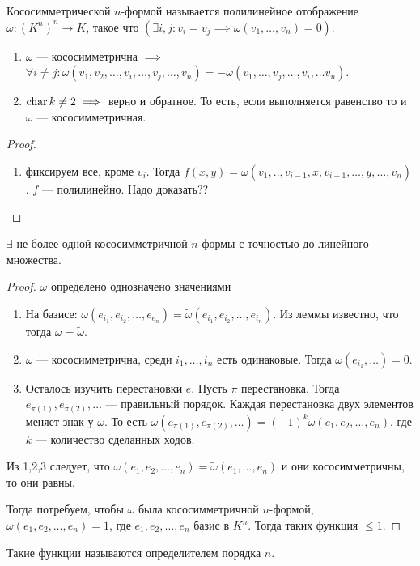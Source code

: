 \begin{definition}
    Кососимметрической $n$-формой называется полилинейное отображение  $\omega\!: (K^n)^n \to K$, такое что  $(\exists i, j\!: v_i = v_j \implies \omega(v_1, \ldots, v_n) = 0)$.
\end{definition}
\begin{statement}
    \begin{enumerate}
        \item $\omega$ --- кососимметрична  $\implies$  $\forall i \neq j\!: \omega(v_1, v_2, \ldots, v_i, \ldots, v_j, \ldots, v_n) = - \omega(v_1,\ldots, v_j, \ldots, v_i, \ldots v_n)$.
        \item $\operatorname{char} k \neq 2 \implies $ верно и обратное. То есть, если выполняется равенство то и  $\omega$ --- кососимметричная. 
    \end{enumerate}
\end{statement}
\begin{proof}
    \begin{enumerate}
        \item фиксируем все, кроме $v_i$. Тогда  $f(x, y) = \omega(v_1, .., v_{i-1}, x, v_{i+1}, \ldots, y, \ldots, v_n)$. $f$ --- полилинейно. Надо доказать?? 
    \end{enumerate}
\end{proof}
\begin{statement}
    $\exists$ не более одной кососимметричной  $n$-формы с точностью до линейного множества. 
\end{statement}
\begin{proof}
    $\omega$ определено однозначено значениями
     \begin{enumerate}
         \item На базисе: $\omega(e_{i_1}, e_{i_2}, \ldots, e_{e_n}) = \widetilde{\omega}(e_{i_1}, e_{i_2}, \ldots, e_{i_n})$. Из леммы известно, что тогда $\omega = \widetilde{\omega}$. 
         \item $\omega$ --- кососимметрична, среди  $i_1, \ldots, i_n$ есть одинаковые. Тогда $\omega(e_{i_1},\ldots) = 0$.
         \item Осталось изучить перестановки $e$. Пусть $\pi$ перестановка. Тогда  $e_{\pi(1)}, e_{\pi(2)}, \ldots$ --- правильный порядок. Каждая перестановка двух элементов меняет знак у $\omega$. То есть  $\omega(e_{\pi(1)}, e_{\pi(2)}, \ldots) = (-1)^k \omega(e_1, e_2, \ldots, e_n)$, где $k$ --- количество сделанных ходов.
    \end{enumerate}
    Из 1,2,3 следует, что  $\omega(e_1, e_2, \ldots, e_n) = \widetilde{\omega}(e_1, \ldots, e_n)$ и они кососимметричны, то они равны. 

    Тогда потребуем, чтобы $\omega$ была кососимметричной  $n$-формой,  $\omega(e_1, e_2,\ldots, e_n) = 1$, где $e_1, e_2, \ldots, e_n$ базис в $K^n$. Тогда таких функция  $\le 1$.
\end{proof}
\begin{definition}
    Такие функции называются определителем порядка $n$.
\end{definition}

